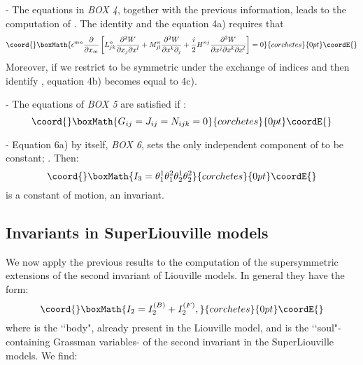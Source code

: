 \documentclass[a4paper,11pt,twoside]{article}
\begin{document}
\vspace*{0.1cm}

- \coordHE{} The equations in {\it BOX 4}, together with the previous
information, leads to the  computation of \coordHE{}. The identity
\coordHE{} and the
equation 4a) requires that
\[\coord{}\boxMath{
\epsilon^{mn} \displaystyle\frac{\partial}{\partial x_m} \left[ L^n_{jk}
\frac{\partial^2 W}{\partial x_j\partial x^l}+
M^n_{jl}\frac{\partial^2 W}{\partial x^k\partial_j}+\frac{i}{2}
H^{nj}\frac{\partial^3 W}{\partial x^j\partial x^k\partial x^l}
\right]=0
}{corchetes}{0pt}\coordE{}\]
Moreover, if we restrict \coordHE{} to be symmetric under the
exchange of indices and then identify \coordHE{},
equation 4b) becomes equal to 4c).

\vspace*{0.1cm}

- \coordHE{} The equations of {\it BOX 5} are satisfied if :
\[\coord{}\boxMath{
G_{ij}=J_{ij}=N_{ijk}=0
}{corchetes}{0pt}\coordE{}\]

\vspace*{0.1cm}

- \coordHE{} Equation 6a) by itself, {\it BOX 6}, sets the only
independent component of  \coordHE{} to be constant; \coordHE{}. Then:
\[\coord{}\boxMath{
I_3=\theta_1^1 \theta_1^2 \theta_2^1 \theta_2^2
}{corchetes}{0pt}\coordE{}\]
is a constant of motion, an invariant.

\subsection{Invariants in SuperLiouville models}

We now apply the previous results to the computation of the
supersymmetric extensions of the second invariant of Liouville
models. In general they have the form:
\[\coord{}\boxMath{
I_2=I_2^{(B)}+I_2^{(F)},
}{corchetes}{0pt}\coordE{}\]
where \coordHE{} is the \lq\lq body", already present in the Liouville
model, and \coordHE{} is the \lq\lq soul"-containing Grassman
variables- of the second invariant in the SuperLiouville models.
We find:
\end{document}
